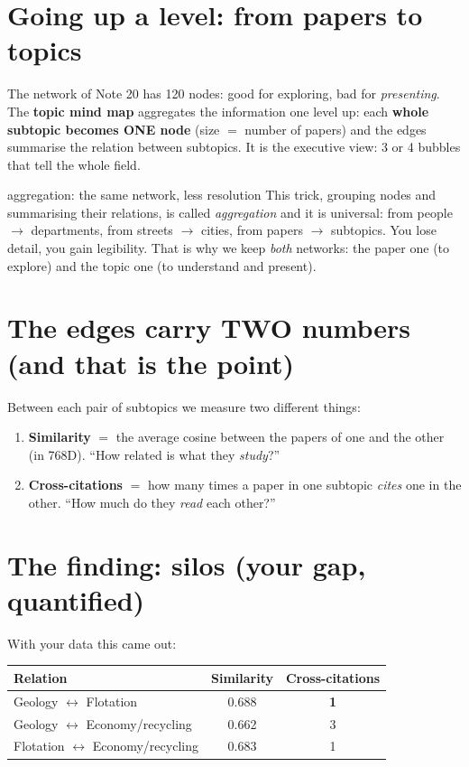 \documentclass[11pt,a4paper]{article}
\begin{document}

\section{Going up a level: from papers to topics}

The network of Note 20 has 120 nodes: good for exploring, bad for \emph{presenting}. The
\textbf{topic mind map} aggregates the information one level up: each \textbf{whole subtopic
becomes ONE node} (size $=$ number of papers) and the edges summarise the relation between
subtopics. It is the executive view: 3 or 4 bubbles that tell the whole field.

\begin{concepto}{aggregation: the same network, less resolution}
This trick, grouping nodes and summarising their relations, is called \emph{aggregation} and
it is universal: from people $\rightarrow$ departments, from streets $\rightarrow$ cities, from
papers $\rightarrow$ subtopics. You lose detail, you gain legibility. That is why we keep
\emph{both} networks: the paper one (to explore) and the topic one (to understand and
present).
\end{concepto}

\section{The edges carry TWO numbers (and that is the point)}

Between each pair of subtopics we measure two different things:
\begin{enumerate}
  \item \textbf{Similarity} $=$ the average cosine between the papers of one and the other (in
        768D). ``How related is what they \emph{study}?''
  \item \textbf{Cross-citations} $=$ how many times a paper in one subtopic \emph{cites} one in
        the other. ``How much do they \emph{read} each other?''
\end{enumerate}

\section{The finding: silos (your gap, quantified)}

With your data this came out:

\begin{center}
\begin{tabular}{lcc}
\textbf{Relation} & \textbf{Similarity} & \textbf{Cross-citations} \\
\hline
Geology $\leftrightarrow$ Flotation & 0.688 & \textbf{1} \\
Geology $\leftrightarrow$ Economy/recycling & 0.662 & 3 \\
Flotation $\leftrightarrow$ Economy/recycling & 0.683 & 1 \\
\end{tabular}
\end{center}
\end{document}
